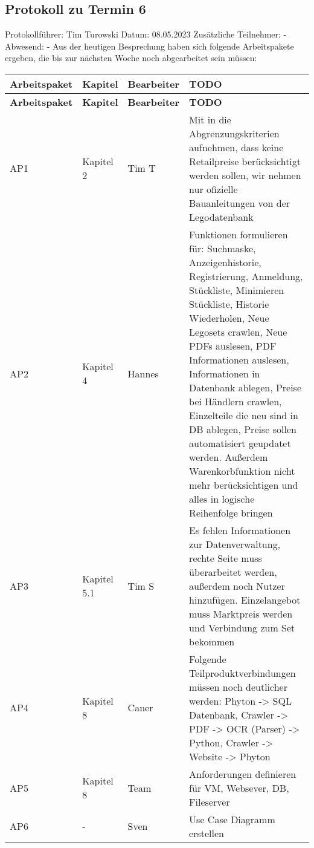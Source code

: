 \subsection{Protokoll zu Termin 6}
Protokollführer: Tim Turowski \newline
Datum: 08.05.2023 \newline
Zusätzliche Teilnehmer: - \newline
Abwesend: - \newline \newline
Aus der heutigen Besprechung haben sich folgende Arbeitspakete ergeben, die bis zur nächsten Woche noch abgearbeitet sein müssen:
\begin{flushleft}
	\begin{longtable}{p{3cm}p{2cm}p{2cm}p{6cm}}
		\toprule
		\textbf{Arbeitspaket} & \textbf{Kapitel} & \textbf{Bearbeiter} & \textbf{TODO}\\
		\midrule\endfirsthead
		\toprule
		\textbf{Arbeitspaket} & \textbf{Kapitel} & \textbf{Bearbeiter} & \textbf{TODO}\\
\midrule\endfirsthead
		AP1 & Kapitel 2 &  Tim T & Mit in die Abgrenzungskriterien aufnehmen, dass keine Retailpreise berücksichtigt werden sollen, wir nehmen nur ofizielle Bauanleitungen von der Legodatenbank \\ \midrule
		AP2& Kapitel 4 &  Hannes & Funktionen formulieren für: Suchmaske, Anzeigenhistorie, Registrierung, Anmeldung, Stückliste, Minimieren Stückliste, Historie Wiederholen, Neue Legosets crawlen, Neue PDFs auslesen, PDF Informationen auslesen, Informationen in Datenbank ablegen, Preise bei Händlern crawlen, Einzelteile die neu sind in DB ablegen, Preise sollen automatisiert geupdatet werden. Außerdem Warenkorbfunktion nicht mehr berücksichtigen und alles in logische Reihenfolge bringen\\ \midrule
		AP3 & Kapitel 5.1 &  Tim S & Es fehlen Informationen zur Datenverwaltung, rechte Seite muss überarbeitet werden, außerdem noch Nutzer hinzufügen. Einzelangebot muss Marktpreis werden und Verbindung zum Set bekommen \\ \midrule
		AP4 & Kapitel 8 & Caner & Folgende Teilproduktverbindungen müssen noch deutlicher werden: Phyton -> SQL Datenbank, Crawler -> PDF -> OCR (Parser) -> Python, Crawler -> Website -> Phyton  \\ \midrule
		AP5 & Kapitel 8 &  Team &  Anforderungen definieren für VM, Websever, DB, Fileserver \\ \midrule
		AP6 & - &  Sven &  Use Case Diagramm erstellen \\ \midrule

\end{longtable}
\end{flushleft}

